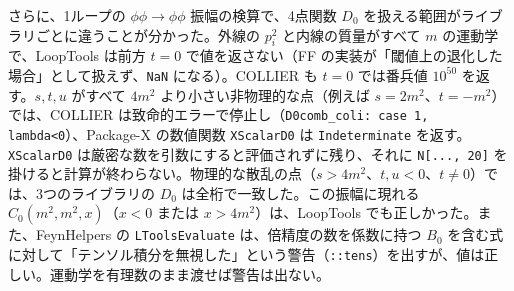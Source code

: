 \documentclass[a4paper,10pt]{ltjsarticle}
\newcommand{\bq}{\textasciigrave}
\begin{document}
さらに、1ループの $\phi\phi\to\phi\phi$ 振幅の検算で、4点関数 $D_0$ を扱える範囲がライブラリごとに違うことが分かった。外線の $p_i^2$ と内線の質量がすべて $m$ の運動学で、LoopTools は前方 $t=0$ で値を返さない（FF の実装が「閾値上の退化した場合」として扱えず、\texttt{NaN} になる）。COLLIER も $t=0$ では番兵値 $10^{50}$ を返す。$s,t,u$ がすべて $4m^2$ より小さい非物理的な点（例えば $s=2m^2$、$t=-m^2$）では、COLLIER は致命的エラーで停止し（\texttt{D0comb\_coli: case 1, lambda<0}）、Package-X の数値関数 \texttt{X\bq ScalarD0} は \texttt{Indeterminate} を返す。\texttt{X\bq ScalarD0} は厳密な数を引数にすると評価されずに残り、それに \texttt{N[..., 20]} を掛けると計算が終わらない。物理的な散乱の点（$s>4m^2$、$t,u<0$、$t\ne0$）では、3つのライブラリの $D_0$ は全桁で一致した。この振幅に現れる $C_0(m^2,m^2,x)$（$x<0$ または $x>4m^2$）は、LoopTools でも正しかった。また、FeynHelpers の \texttt{LToolsEvaluate} は、倍精度の数を係数に持つ $B_0$ を含む式に対して「テンソル積分を無視した」という警告（\texttt{::tens}）を出すが、値は正しい。運動学を有理数のまま渡せば警告は出ない。
\end{document}
